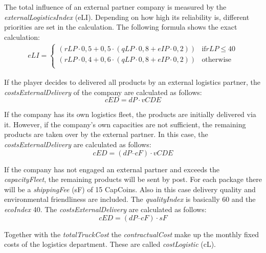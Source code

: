 The total influence of an external partner company is measured by the \textit{externalLogisticsIndex} (\gls{eLI}). Depending on how high its reliability is, different priorities are set in the calculation. The following formula shows the exact calculation: 
\begin{equation}
\label{func:externalLogisticIndex}
\begin{aligned}
eLI = 
    \begin{cases}
     (rLP\cdot0,5 + 0,5\cdot(qLP\cdot0,8 + eIP\cdot0,2)) & \text{if} rLP \leq 40\\
     (rLP\cdot0,4 + 0,6\cdot(qLP\cdot0,8 + eIP\cdot0,2)) & \text{otherwise} \\
    \end{cases}
\end{aligned}
\end{equation}

If the player decides to delivered all products by an external logistics partner, the \textit{costsExternalDelivery} of the company are calculated as follows:
\begin{equation}
\label{func:costExternalDelivery_all}
   cED = dP \cdot vCDE
\end{equation}

If the company has its own logistics fleet, the products are initially delivered via it. However, if the company's own capacities are not sufficient, the remaining products are taken over by the external partner. In this case, the \textit{costsExternalDelivery} are calculated as follows: 
\begin{equation}
\label{func:costExternalDelivery_partly}
    cED = ( dP – cF ) \cdot vCDE
\end{equation}

If the company has not engaged an external partner and exceeds the \textit{capacityFleet}, the remaining products will be sent by post. For each package there will be a \textit{shippingFee} (\gls{sF}) of 15 CapCoins. Also in this case delivery quality and environmental friendliness are included. The \textit{qualityIndex} is basically 60 and the \textit{ecoIndex} 40. The \textit{costsExternalDelivery} are calculated as follows:  
\begin{equation}
\label{func:costExternalDelivery_post}
    cED = ( dP – cF ) \cdot sF
\end{equation}

Together with the \textit{totalTruckCost} the \textit{contractualCost} make up the monthly fixed costs of the logistics department. These are called \textit{costLogistic} (\gls{cL}). 

